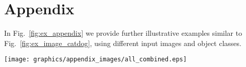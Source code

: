 \documentclass[conference]{IEEEtran}
\def\cf{\emph{cf.~}}
\begin{document}







\newpage
\onecolumn
\section*{Appendix}
\label{sec:appendix}

In Fig.~\ref{fig:ex_appendix} we provide further illustrative examples similar to Fig.~\ref{fig:ex_image_catdog},
using different input images and object classes.

\begin{figure*}[!h]
  \begin{center}
    \texttt{[image: graphics/appendix\_images/all\_combined.eps]}
    \caption{Different attributions for the output classes
    ``Bernese Mountain Dog'' and ``French Bulldog'' (A),
    ``Persian Cat'' and ``Siamese Cat'' (B),
    ``Zebra'' and ``African Elephant'' (C) and
    ``Sunglasses'' and ``Windsor Tie'' (D and E),
    using the pretrained VGG-16 model.
    For details \cf Fig.~\ref{fig:ex_image_catdog}.
    }
    \label{fig:ex_appendix}
  \end{center}
\end{figure*}
\end{document}
